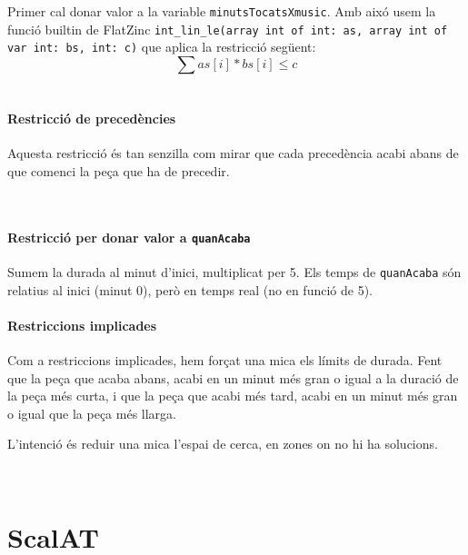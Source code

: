 \documentclass[11pt,a4paper,twoside]{report}
\begin{document}
Primer cal donar valor a la variable \texttt{minutsTocatsXmusic}. Amb aixó usem la funció builtin de FlatZinc 
\texttt{int\_lin\_le(array int of int: as, array int of var int: bs, int: c)} que aplica la restricció següent:
\[
    \sum as[i] * bs[i] \leq c
\]
~\\


\subsubsection*{Restricció de precedències}

Aquesta restricció és tan senzilla com mirar que cada precedència acabi abans de que comenci la peça que ha de precedir.

~\\



\subsubsection*{Restricció per donar valor a \texttt{quanAcaba}}
Sumem la durada al minut d'inici, multiplicat per 5. Els temps de \texttt{quanAcaba} són relatius al inici (minut 0), però en temps real (no en funció de 5).
~\\



\subsubsection*{Restriccions implicades}
Com a restriccions implicades, hem forçat una mica els límits de durada. 
Fent que la peça que acaba abans, acabi en un minut més gran o igual a la duració de la peça més curta, 
i que la peça que acabi més tard, acabi en un minut més gran o igual que la peça més llarga.

L'intenció és reduir una mica l'espai de cerca, en zones on no hi ha solucions.

~\\






\chapter{ScalAT}
\end{document}
